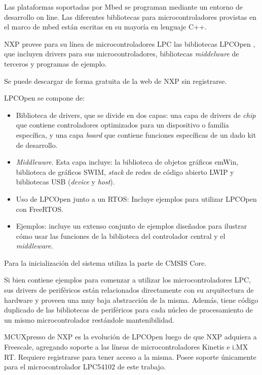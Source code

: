 Las plataformas soportadas por Mbed se programan mediante un entorno de desarrollo on line. Las diferentes bibliotecas para microcontroladores provistas en el marco de mbed están escritas en su mayoría en lenguaje C++.


NXP provee para su línea de microcontroladores LPC las bibliotecas LPCOpen \citep{LPCOpenNXP}, que incluyen drivers para sus microcontroladores, bibliotecas \emph{middelware} de terceros y programas de ejemplo. 

Se puede descargar de forma gratuita de la web de NXP sin registrarse.

LPCOpen se compone de:

\begin{itemize}
\item
Biblioteca de drivers, que se divide en dos capas: una capa de drivers de \emph{chip} que contiene controladores optimizados para un dispositivo o familia específica, y una capa \emph{board} que contiene funciones específicas de un dado kit de desarrollo.
\item
\emph{Middleware}. Esta capa incluye: la biblioteca de objetos gráficos emWin, biblioteca de gráficos SWIM, \emph{stack} de redes de código abierto LWIP y bibliotecas USB (\emph{device} y \emph{host}).
\item
Uso de LPCOpen junto a un RTOS: Incluye ejemplos para utilizar LPCOpen con FreeRTOS.
\item
Ejemplos: incluye un extenso conjunto de ejemplos diseñados para ilustrar cómo usar las funciones de la biblioteca del controlador central y el \emph{middleware}.
\end{itemize}

Para la inicialización del sistema utiliza la parte de CMSIS Core.

Si bien contiene ejemplos para comenzar a utilizar los microcontroladores LPC, sus drivers de periféricos están relacionados directamente con su arquitectura de hardware y proveen una muy baja abstracción de la misma. Además, tiene código duplicado de las bibliotecas de periféricos para cada núcleo de procesamiento de un mismo microcontrolador restándole mantenibilidad.

MCUXpresso \citep{MCUXpresso} de NXP es la evolución de LPCOpen luego de que NXP adquiera a Freescale,  agregando soporte a las líneas de microcontroladores Kinetis e i.MX RT. Requiere registrarse para tener acceso a la misma. Posee soporte únicamente para el microcontrolador LPC54102 de este trabajo.

